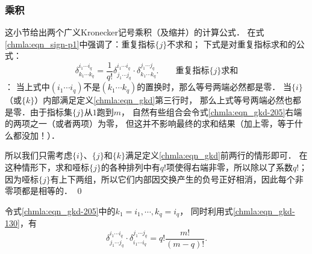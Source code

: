 \subsubsection{乘积}
这小节给出两个广义Kronecker记号乘积（及缩并）的计算公式． 
在式\eqref{chmla:eqn_sign-p1}中强调了：{\kaishu 重复指标$\{j\}$不求和}；
下式是对重复指标求和的公式：
\begin{equation}\label{chmla:eqn_gkd-205}
    \delta_{k_1 \cdots k_q}^{i_1 \cdots i_q} =
      \frac{1}{q!}\delta_{j_1 \cdots j_q}^{i_1 \cdots i_q}
      \cdot \delta_{k_1 \cdots k_q}^{j_1 \cdots j_q} .
      \qquad \text{重复指标$\{j\}$求和}
\end{equation}
：
当上式中$(i_1 \cdots i_q)$不是$(k_1 \cdots k_q)$的置换时，那么等号两端必然都是零．
当$\{i\}$（或$\{k\}$）内部满足定义\eqref{chmla:eqn_gkd}第三行时，
那么上式等号两端必然也都是零．由于指标集$\{j\}$从$1$跑到$m$，
自然有些组合会令式\eqref{chmla:eqn_gkd-205}右端的两项之一（或者两项）为零，
但这并不影响最终的{\kaishu 求和}结果（加上零，等于什么都没加！）．

所以我们只需考虑$\{i\}$、$\{j\}$和$\{k\}$满足定义\eqref{chmla:eqn_gkd}前两行的情形即可．
在这种情形下，求和哑标$\{j\}$的各种排列中有$q!$项使得右端非零，所以除以了系数$q!$；
因为哑标$\{j\}$有上下两组，所以它们内部因交换产生的负号正好相消，因此每个非零项都是相等的．
\qed

令式\eqref{chmla:eqn_gkd-205}中的$k_{1}=i_{1},\cdots, k_q=i_q$，
同时利用式\eqref{chmla:eqn_gkd-130}，有
\begin{equation}\label{chmla:eqn_gkd-225}
    \delta_{j_1 \cdots j_q }^{i_1 \cdots i_q }
    \cdot \delta_{i_{1}\cdots i_q }^{j_1 \cdots j_q }
    =q! \frac{m!}{(m-q)!} .
\end{equation}

